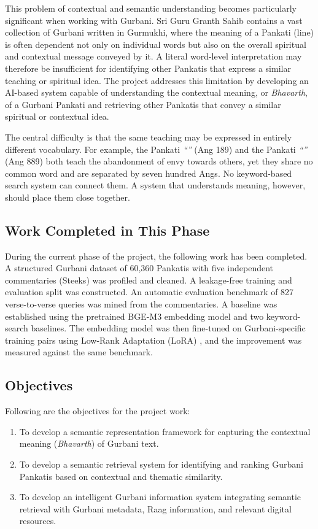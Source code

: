 \documentclass[12pt,a4paper]{article}
\begin{document}
This problem of contextual and semantic understanding becomes particularly significant when working with Gurbani. Sri Guru Granth Sahib contains a vast collection of Gurbani written in Gurmukhi, where the meaning of a Pankati (line) is often dependent not only on individual words but also on the overall spiritual and contextual message conveyed by it. A literal word-level interpretation may therefore be insufficient for identifying other Pankatis that express a similar teaching or spiritual idea. The project addresses this limitation by developing an AI-based system capable of understanding the contextual meaning, or \textit{Bhavarth}, of a Gurbani Pankati and retrieving other Pankatis that convey a similar spiritual or contextual idea.

The central difficulty is that the same teaching may be expressed in entirely different vocabulary. For example, the Pankati \textit{``''} (Ang 189) and the Pankati \textit{``''} (Ang 889) both teach the abandonment of envy towards others, yet they share no common word and are separated by seven hundred Angs. No keyword-based search system can connect them. A system that understands meaning, however, should place them close together.

\subsection{Work Completed in This Phase}

During the current phase of the project, the following work has been completed. A structured Gurbani dataset of 60,360 Pankatis with five independent commentaries (Steeks) was profiled and cleaned. A leakage-free training and evaluation split was constructed. An automatic evaluation benchmark of 827 verse-to-verse queries was mined from the commentaries. A baseline was established using the pretrained BGE-M3 embedding model and two keyword-search baselines. The embedding model was then fine-tuned on Gurbani-specific training pairs using Low-Rank Adaptation (LoRA) \cite{hu2022lora}, and the improvement was measured against the same benchmark.
\newpage

\subsection{Objectives}

Following are the objectives for the project work:

\begin{enumerate}
    \item To develop a semantic representation framework for capturing the contextual meaning (\textit{Bhavarth}) of Gurbani text.

    \item To develop a semantic retrieval system for identifying and ranking Gurbani Pankatis based on contextual and thematic similarity.

    \item To develop an intelligent Gurbani information system integrating semantic retrieval with Gurbani metadata, Raag information, and relevant digital resources.
\end{enumerate}
\newpage
\end{document}

